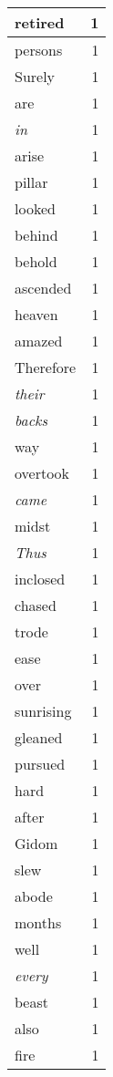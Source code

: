 \begin{center}
\begin{longtable}{l|r}
retired & 1 \\ \hline
persons & 1 \\ \hline
Surely & 1 \\ \hline
are & 1 \\ \hline
\emph{in} & 1 \\ \hline
arise & 1 \\ \hline
pillar & 1 \\ \hline
looked & 1 \\ \hline
behind & 1 \\ \hline
behold & 1 \\ \hline
ascended & 1 \\ \hline
heaven & 1 \\ \hline
amazed & 1 \\ \hline
Therefore & 1 \\ \hline
\emph{their} & 1 \\ \hline
\emph{backs} & 1 \\ \hline
way & 1 \\ \hline
overtook & 1 \\ \hline
\emph{came} & 1 \\ \hline
midst & 1 \\ \hline
\emph{Thus} & 1 \\ \hline
inclosed & 1 \\ \hline
chased & 1 \\ \hline
trode & 1 \\ \hline
ease & 1 \\ \hline
over & 1 \\ \hline
sunrising & 1 \\ \hline
gleaned & 1 \\ \hline
pursued & 1 \\ \hline
hard & 1 \\ \hline
after & 1 \\ \hline
Gidom & 1 \\ \hline
slew & 1 \\ \hline
abode & 1 \\ \hline
months & 1 \\ \hline
well & 1 \\ \hline
\emph{every} & 1 \\ \hline
beast & 1 \\ \hline
also & 1 \\ \hline
fire & 1 \\ \hline
\end{longtable}
\end{center}



